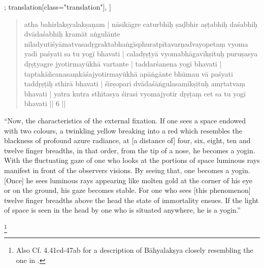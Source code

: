 \begin{alignment}[
  texts=edition[class="edition"];
  translation[class="translation"],
  ]
\begin{translation}
\begin{tlate}
{\begin{quote}
atha bahirlakṣyalakṣaṇam | nāsikāgre caturbhiḥ ṣaḍbhir aṣṭabhiḥ daśabhiḥ dvādaśabhiḥ kramāt aṅgulānte nīladyutiśyāmatvasadṛgraktabhaṅgīsphuratpītavarṇadvayopetaṃ vyoma yadi paśyati sa tu yogī bhavati | caladṛṣṭyā vyomabhāgavīkṣituḥ puruṣasya dṛṣṭyagre jyotirmayūkhā vartante | taddarśanena yogī bhavati | taptakāñcanasaṃkāśajyotirmayūkhā apāṅgānte bhūmau vā paśyati taddṛṣṭiḥ sthirā bhavati | śīrṣopari dvādaśāṅgulasamīkṣituḥ amṛtatvaṃ bhavati | yatra kutra sthitasya śirasi vyomajyotir dṛṣṭaṃ cet sa tu yogī bhavati || 6 ||
\end{quote}
``Now, the characteristics of the external fixation. If one sees a space endowed with two colours, a twinkling yellow breaking into a red which resembles the blackness of profound azure radiance, at [a distance of] four, six, eight, ten and twelve finger breadths, in that order, from the tip of a nose, he becomes a yogin. With the fluctuating gaze of one who looks at the portions of space luminous rays manifest in front of the observers visions. By seeing that, one becomes a yogin. [Once] he sees luminous rays appearing like molten gold at the corner of his eye or on the ground, his gaze becomes stable. For one who sees [this phenomenon] twelve finger breadths above the head the state of immortality ensues. If the light of space is seen in the head by one who is situated anywhere, he is a yogin.''}\footnote{Also Cf.  4.41cd-47ab for a description of Bāhyalakṣya closely resembling the one in .}
\end{tlate}
  \end{translation}
\end{alignment}
\ekdpb*{}
